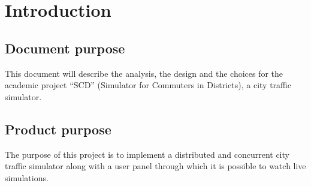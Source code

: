 \section{Introduction}
\subsection{Document purpose}
This document will describe the analysis, the design and the choices for the
academic project ``SCD'' (Simulator for Commuters in Districts), a city traffic
simulator.

\subsection{Product purpose}\label{productPurpose}
The purpose of this project is to implement a distributed and concurrent city
traffic simulator along with a user panel through which it is possible to
watch live simulations.
